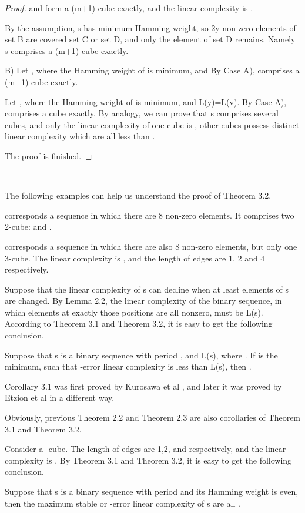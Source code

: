 \documentclass[10pt,conference,twocolumn]{IEEEtran}
\begin{document}
\begin{proof}
 and 
form a (m+1)-cube exactly, and the linear complexity is
.

By the assumption, s has minimum Hamming weight, so 2y non-zero
elements of set B are covered set C or set D, and only the element
 of set D remains. Namely s
comprises a (m+1)-cube exactly.

B) Let , where the Hamming weight of
 is minimum, and
 By Case A),
 comprises a (m+1)-cube exactly.

Let , where the Hamming weight of 
is minimum, and L(y)=L(v). By Case A),  comprises a cube
exactly. By analogy, we can prove that s comprises several cubes,
and only the linear complexity of one cube is
, other cubes
possess distinct linear complexity which are all less than
.

The proof is finished.
\end{proof}\

The following examples can help us understand the proof of Theorem
3.2.


corresponds a sequence in which there are 8 non-zero elements. It
comprises two 2-cube:  and .

  corresponds
a sequence in which there are also 8 non-zero elements, but only one
3-cube. The linear complexity is , and the length of
edges are 1, 2 and 4 respectively.

Suppose that the linear complexity of s can decline when at least
 elements of s are changed. By Lemma 2.2, the linear complexity
of the binary sequence, in which elements at exactly those 
positions are all nonzero, must be L(s). According to Theorem 3.1
and Theorem 3.2, it is easy to get the following conclusion.


 Suppose that s is a binary sequence
with period  , and L(s),
where  . If  is the minimum,
such that -error linear complexity is less than L(s), then
.

Corollary 3.1 was first proved by Kurosawa et al \cite{Kurosawa},
and later it was proved by Etzion et al \cite{Etzion} in a different
way.

Obviously, previous Theorem 2.2 and Theorem 2.3 are also corollaries
of Theorem 3.1 and Theorem 3.2.

Consider a -cube. The length of edges are 1,2, and
 respectively, and the linear complexity is .
By Theorem 3.1 and Theorem 3.2, it is easy to get the following
conclusion.

 Suppose that s is a binary sequence
with period   and its Hamming weight is even, then the maximum
stable  or -error linear complexity of
s are all .
\end{document}
